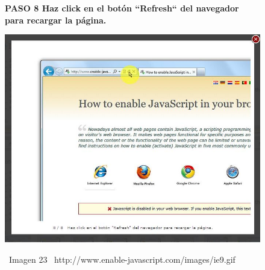 \documentclass[11pt]{article} %
\begin{document}
\begin{figure}
\begin{center}



\begin{center}
\bf PASO 8
Haz click en el botón ``Refresh`` del navegador para recargar la página.


\includegraphics[height=8 cm, width=8 cm] {imagenes/explorer 08.jpg}
\end{center}
\ Imagen 23
\ {http://www.enable-javascript.com/images/ie9.gif }

\end{center}
\end{figure}
\end{document}
